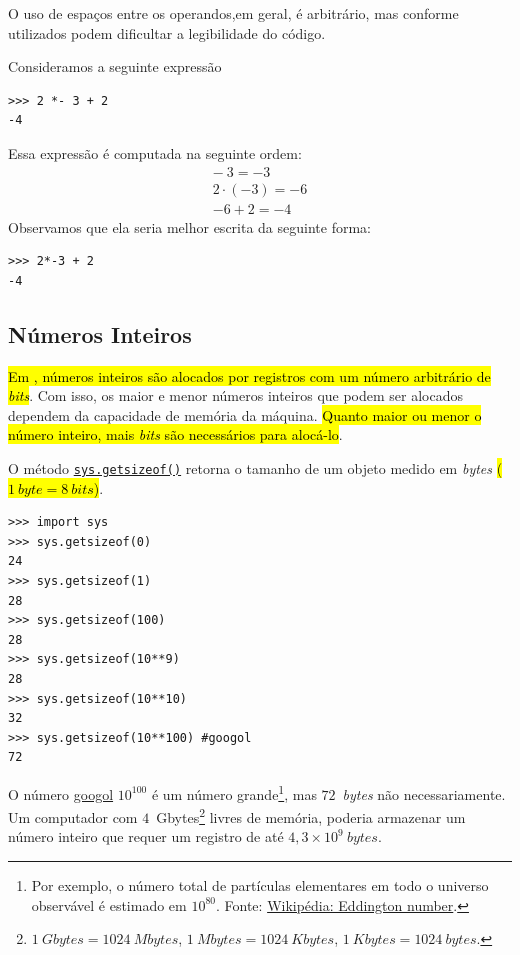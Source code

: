 O uso de espaços entre os operandos,em geral, é arbitrário, mas conforme utilizados podem dificultar a legibilidade do código.

\begin{ex}
  Consideramos a seguinte expressão
\begin{lstlisting}
>>> 2 *- 3 + 2
-4
\end{lstlisting}
  Essa expressão é computada na seguinte ordem:
  \begin{gather}
    -~3 = -3\\
    2\cdot(-3) = -6\\
    -6 + 2 = -4
  \end{gather}
  Observamos que ela seria melhor escrita da seguinte forma:
\begin{lstlisting}
>>> 2*-3 + 2
-4
\end{lstlisting}
\end{ex}

\subsection{Números Inteiros}

\hl{Em {\python}, números inteiros são alocados por registros com um número arbitrário de {\it bits}}. Com isso, os maior e menor números inteiros que podem ser alocados dependem da capacidade de memória da máquina. \hl{Quanto maior ou menor o número inteiro, mais {\it bits} são necessários para alocá-lo}.

\begin{ex}
  O método {\python} \href{https://docs.python.org/3/library/sys.html#sys.getsizeof}{\lstinline+sys.getsizeof()+} retorna o tamanho de um objeto medido em {\it bytes} \hl{($1~\textit{byte} = 8~\textit{bits}$)}.
\begin{lstlisting}
>>> import sys
>>> sys.getsizeof(0)
24
>>> sys.getsizeof(1)
28
>>> sys.getsizeof(100)
28
>>> sys.getsizeof(10**9)
28
>>> sys.getsizeof(10**10)
32
>>> sys.getsizeof(10**100) #googol
72
\end{lstlisting}

  O número \href{https://en.wikipedia.org/wiki/Googol}{googol} $10^{100}$ é um número grande\footnote{Por exemplo, o número total de partículas elementares em todo o universo observável é estimado em $10^{80}$. Fonte: \href{https://en.wikipedia.org/wiki/Eddington_number}{Wikipédia: Eddington number}.}, mas $72$~\textit{bytes} não necessariamente. Um computador com $4$~Gbytes\footnote{$1~\textit{Gbytes} = 1024~\textit{Mbytes}$, $1~\textit{Mbytes} = 1024~\textit{Kbytes}$, $1~\textit{Kbytes} = 1024~\textit{bytes}$.} livres de memória, poderia armazenar um número inteiro que requer um registro de até $4,3\times 10^9~\textit{bytes}$.
\end{ex}

